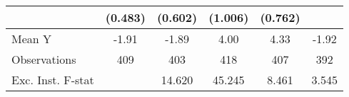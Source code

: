 {\begin{tabular}{l*{5}{c}}
            &     (0.483)         &     (0.602)         &     (1.006)         &     (0.762)         &                     \\
\midrule
Mean Y      &       -1.91         &       -1.89         &        4.00         &        4.33         &       -1.92         \\
Observations&         409         &         403         &         418         &         407         &         392         \\
Exc. Inst. F-stat&                     &      14.620         &      45.245         &       8.461         &       3.545         \\
\bottomrule
\end{tabular}
}
